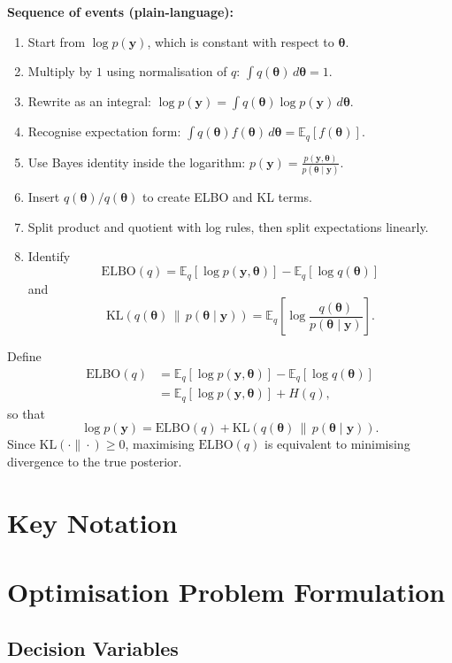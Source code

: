 \documentclass[11pt]{article}
\newcommand{\E}{\mathbb{E}}
\newcommand{\ELBO}{\mathrm{ELBO}}
\begin{document}
\textbf{Sequence of events (plain-language):}
\begin{enumerate}
\item Start from $\log p(\bm y)$, which is constant with respect to $\bm\theta$.
\item Multiply by $1$ using normalisation of $q$: $\int q(\bm\theta)\,d\bm\theta=1$.
\item Rewrite as an integral: $\log p(\bm y)=\int q(\bm\theta)\log p(\bm y)\,d\bm\theta$.
\item Recognise expectation form: $\int q(\bm\theta)f(\bm\theta)\,d\bm\theta=\E_q[f(\bm\theta)]$.
\item Use Bayes identity inside the logarithm: $p(\bm y)=\frac{p(\bm y,\bm\theta)}{p(\bm\theta\mid\bm y)}$.
\item Insert $q(\bm\theta)/q(\bm\theta)$ to create ELBO and KL terms.
\item Split product and quotient with log rules, then split expectations linearly.
\item Identify
\[\ELBO(q)=\E_q[\log p(\bm y,\bm\theta)]-\E_q[\log q(\bm\theta)]\]
and
\[\mathrm{KL}\!\left(q(\bm\theta)\,\|\,p(\bm\theta\mid\bm y)\right)=\E_q\!\left[\log\frac{q(\bm\theta)}{p(\bm\theta\mid\bm y)}\right].\]
\end{enumerate}

Define
\begin{align}
\ELBO(q)
&= \E_q[\log p(\bm y,\bm\theta)]-\E_q[\log q(\bm\theta)] \\
&= \E_q[\log p(\bm y,\bm\theta)] + H(q),
\end{align}
so that
\begin{equation}
\log p(\bm y) = \ELBO(q) + \mathrm{KL}\!\left(q(\bm\theta)\,\|\,p(\bm\theta\mid\bm y)\right).
\end{equation}
Since $\mathrm{KL}(\cdot\|\cdot)\ge 0$, maximising $\ELBO(q)$ is equivalent to minimising divergence to the true posterior.

\section*{Key Notation}


\section*{Optimisation Problem Formulation}

\subsection*{Decision Variables}
\end{document}
